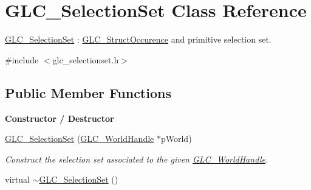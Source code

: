 \hypertarget{class_g_l_c___selection_set}{\section{G\-L\-C\-\_\-\-Selection\-Set Class Reference}
\label{class_g_l_c___selection_set}
}


\hyperlink{class_g_l_c___selection_set}{G\-L\-C\-\_\-\-Selection\-Set} \-: \hyperlink{class_g_l_c___struct_occurence}{G\-L\-C\-\_\-\-Struct\-Occurence} and primitive selection set.  




{\ttfamily \#include $<$glc\-\_\-selectionset.\-h$>$}

\subsection*{Public Member Functions}
\begin{Indent}{\bf Constructor / Destructor}\par
\begin{DoxyCompactItemize}
\item 
\hyperlink{class_g_l_c___selection_set_aca65f0ee3a4ee400b723779ea437ab78}{G\-L\-C\-\_\-\-Selection\-Set} (\hyperlink{class_g_l_c___world_handle}{G\-L\-C\-\_\-\-World\-Handle} $\ast$p\-World)
\begin{DoxyCompactList}\small\item\em Construct the selection set associated to the given \hyperlink{class_g_l_c___world_handle}{G\-L\-C\-\_\-\-World\-Handle}. \end{DoxyCompactList}\item 
virtual \hyperlink{class_g_l_c___selection_set_a60e4579171066a76398909ce1c5f74eb}{$\sim$\-G\-L\-C\-\_\-\-Selection\-Set} ()
\end{DoxyCompactItemize}
\end{Indent}
